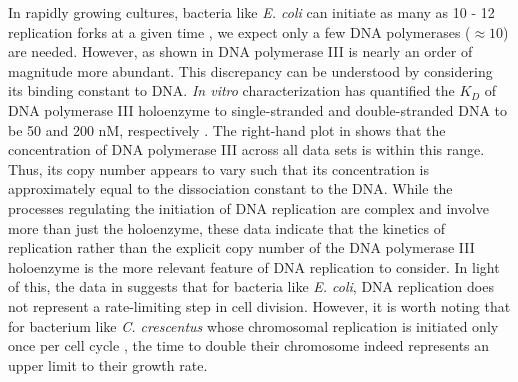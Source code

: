 In rapidly growing cultures, bacteria like \textit{E. coli}
can initiate as many as 10 - 12 replication forks at a
given time \citep{bremer2008, si2017},  we expect only a few DNA polymerases
($\approx 10$) are needed. However, as shown in  DNA
polymerase III is nearly an order of magnitude more abundant. This discrepancy
can be understood by considering its binding constant to DNA. \textit{In vitro} characterization has quantified the $K_D$ of
DNA polymerase III holoenzyme to single-stranded and double-stranded DNA to be
50 and 200 nM, respectively \citep{ason2000}. The right-hand plot in
 shows that the concentration of DNA polymerase III
across all data sets is within this range. Thus, its copy number appears to vary such that its
concentration is approximately equal to the dissociation constant to the DNA.
While the processes regulating the initiation of DNA replication are complex and
involve more than just the holoenzyme, these data indicate that the kinetics of
replication rather than the explicit copy number of the DNA polymerase III
holoenzyme is the more relevant feature of DNA replication to consider. In light
of this, the data in  suggests that for bacteria like
\textit{E. coli}, DNA replication does not represent a rate-limiting step in
cell division. However, it is worth noting that for bacterium like \textit{C.
crescentus} whose chromosomal replication is initiated only once per cell cycle
\citep{jensen2001}, the time to double their chromosome indeed represents an
upper limit to their growth rate.
